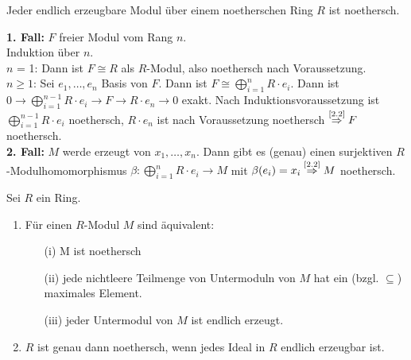 \begin{Folg}
\label{2.3}
  Jeder endlich erzeugbare Modul über einem noetherschen Ring $R$ ist
  noethersch.
\end{Folg}

\begin{Bew}
  \textbf{1. Fall:} $F$ freier Modul vom Rang $n$.\\
  Induktion über $n$.\\
  $n$ = 1: Dann ist $F \cong R$ als $R$-Modul, also noethersch nach
  Voraussetzung.\\
  $n \ge 1$: Sei $e_1, \dots , e_n$ Basis von $F$. Dann ist $F \cong
  \bigoplus_{i = 1}^n R \cdot e_i$. Dann ist $0 \to \bigoplus_{i = 1}^{n-1} R \cdot
  e_i \to F \to R \cdot e_n \to 0$ exakt. Nach Induktionsvoraussetzung ist
  $\bigoplus_{i = 1}^{n-1} R \cdot e_i$ noethersch, $R \cdot e_n$ ist nach
  Voraussetzung noethersch $\overset{\text{\scriptsize \ref{2.2}}}{\Rightarrow}
  F$ noethersch.\\
  \textbf{2. Fall:} $M$ werde erzeugt von $x_1, \dots , x_n$. Dann gibt es
  (genau) einen surjektiven $R$-Modulhomomorphismus $\beta: \bigoplus_{i = 1}^n
  R \cdot e_i \to M$ mit $\beta(e_i) = x_i \overset{\text{\scriptsize
  \ref{2.2}}}{\Rightarrow} M$ noethersch.
\end{Bew}

\begin{Prop}
  Sei $R$ ein Ring.
  \begin{enumerate}
    \item \label{2.4a}Für einen $R$-Modul $M$ sind äquivalent:
      \begin{enumerate}
        \item[(i)] M ist noethersch
        \item[(ii)] jede nichtleere Teilmenge von Untermoduln von $M$ hat ein
                    (bzgl. $\subseteq$) maximales Element.
        \item[(iii)] jeder Untermodul von $M$ ist endlich erzeugt.
      \end{enumerate}
    \item $R$ ist genau dann noethersch, wenn jedes Ideal in $R$ endlich
          erzeugbar ist.
  \end{enumerate}
\end{Prop}

